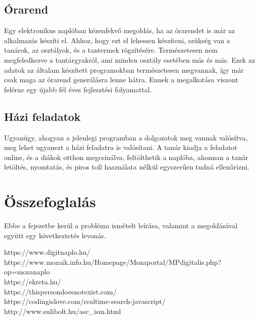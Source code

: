\documentclass[
]{thesis-ekf}
\begin{document}
\section{Órarend}
Egy elektronikus naplóban kézenfekvő megoldás, ha az órarendet is már az alkalmazás készíti el. Ahhoz, hogy ezt el lehessen készíteni, szükség van a tanárok, az osztályok, és a tantermek rögzítésére. Természetesen nem megfeledkezve a tantárgyakról, ami minden osztály esetében más és más. Ezek az adatok az általam készített programokban természetesen megvannak, így már csak maga az órarend generálásra lenne hátra. Ennek a megalkotása viszont felérne egy újabb fél éves fejlesztési folyamattal.
\section{Házi feladatok}
Ugyanúgy, ahogyan a jelenlegi programban a dolgozatok meg vannak valósítva, meg lehet ugyanezt a házi feladatra is valósítani. A  tanár kiadja a feladatot online, és a diákok otthon megcsinálva, feltölthetik a naplóba, ahonnan a tanár letöltés, nyomtatás, és piros toll használata nélkül egyszerűen tudná ellenőrizni. 
\chapter{Összefoglalás}
Ebbe a fejezetbe kerül a probléma ismételt leírása, valamint a megoldásával együtt egy következtetés levonás.
\begin{thebibliography}{}
	https://www.digitnaplo.hu/\\
	https://www.mozaik.info.hu/Homepage/Mozaportal/MPdigitalis.php?op=mozanaplo\\
	https://ekreta.hu/\\
	https://thispersondoesnotexist.com/ \\
	https://codingislove.com/realtime-search-javascript/\\
	http://www.sulibolt.hu/asc\_ism.html
\end{thebibliography}
\end{document}
